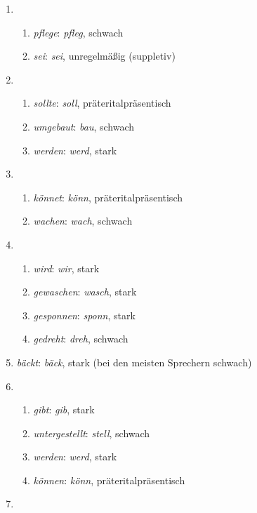 
\begin{enumerate}\Lf
  \item
    \begin{enumerate}\Lf
      \item \textit{pflege}: \textit{pfleg}, schwach
      \item \textit{sei}: \textit{sei}, unregelmäßig (suppletiv)
    \end{enumerate}
  \item
    \begin{enumerate}\Lf
      \item \textit{sollte}: \textit{soll}, präteritalpräsentisch
      \item \textit{umgebaut}: \textit{bau}, schwach
      \item \textit{werden}: \textit{werd}, stark
    \end{enumerate}
  \item
    \begin{enumerate}\Lf
      \item \textit{könnet}: \textit{könn}, präteritalpräsentisch
      \item \textit{wachen}: \textit{wach}, schwach
    \end{enumerate}
  \item
    \begin{enumerate}\Lf
      \item \textit{wird}: \textit{wir}, stark
      \item \textit{gewaschen}: \textit{wasch}, stark
      \item \textit{gesponnen}: \textit{sponn}, stark
      \item \textit{gedreht}: \textit{dreh}, schwach
    \end{enumerate}
  \item \textit{bäckt}: \textit{bäck}, stark (bei den meisten Sprechern schwach)
  \item
    \begin{enumerate}\Lf
      \item \textit{gibt}: \textit{gib}, stark
      \item \textit{untergestellt}: \textit{stell}, schwach
      \item \textit{werden}: \textit{werd}, stark
      \item \textit{können}: \textit{könn}, präteritalpräsentisch
    \end{enumerate}
  \item
    \begin{enumerate}\Lf

\end{enumerate}
\end{enumerate}

